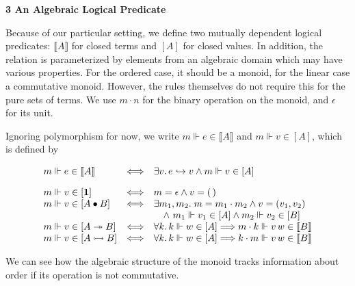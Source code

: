 \documentclass[10pt,a4paper]{amsart}
\begin{document}
 
\par\medskip\noindent\textbf{3 An Algebraic Logical Predicate}\par
 
 
Because of our particular setting, we define two mutually dependent logical predicates: $\llbracket A\rrbracket$ for closed terms and $[A]$ for closed values. In addition, the relation is parameterized by elements from an algebraic domain which may have various properties. For the ordered case, it should be a monoid, for the linear case a commutative monoid. However, the rules themselves do not require this for the pure sets of terms. We use $m\cdot n$ for the binary operation on the monoid, and $\epsilon$ for its unit.\par
 
 
 
Ignoring polymorphism for now, we write $m\Vdash e\in\llbracket A\rrbracket$ and $m\Vdash v\in[A]$, which is defined by\par
  
\par  \quad  \[\begin{array}[]{lcl}m\Vdash e\in\llbracket A\rrbracket&\Longleftrightarrow&\exists v.\,e\mathrel{\hookrightarrow}v\land m\Vdash v\in[A]\\[10.00002pt]
m\Vdash v\in[\mathbf{1}]&\Longleftrightarrow&m=\epsilon\land v=(\,)\\
m\Vdash v\in[A\bullet B]&\Longleftrightarrow&\hskip-5.0pt\begin{array}[t]{l}\exists m_{1},m_{2}.\;m=m_{1}\cdot m_{2}\land v=(v_{1},v_{2})\\
\quad\land\nobreak\ m_{1}\Vdash v_{1}\in[A]\land m_{2}\Vdash v_{2}\in[B]\end{array}\\
m\Vdash v\in[A\twoheadrightarrow B]&\Longleftrightarrow&\forall k.\,k\Vdash w\in[A]\Longrightarrow m\cdot k\Vdash v\,w\in\llbracket B\rrbracket\\
m\Vdash v\in[A\rightarrowtail B]&\Longleftrightarrow&\forall k.\,k\Vdash w\in[A]\Longrightarrow k\cdot m\Vdash v\,w\in\llbracket B\rrbracket\end{array}\]\quad  \quad  
  
We can see how the algebraic structure of the monoid tracks information about order if its operation is not commutative.\par
 
\end{document}
